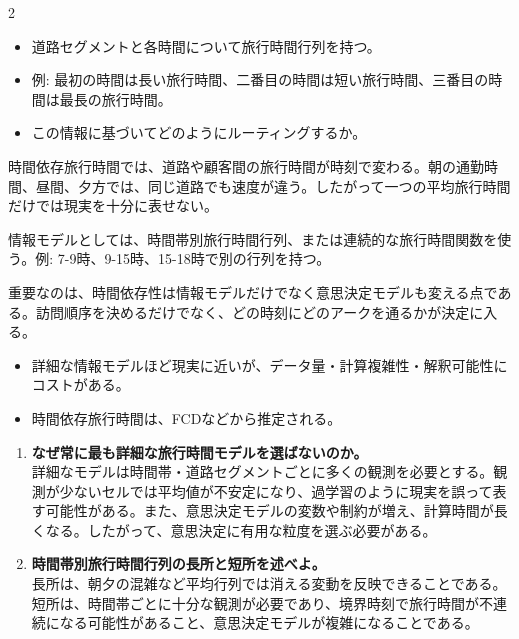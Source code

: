 \clearpage
{}
\begin{multicols}{2}\footnotesize\raggedcolumns
{}
\begin{itemize}
\item 道路セグメントと各時間について旅行時間行列を持つ。
\item 例: 最初の時間は長い旅行時間、二番目の時間は短い旅行時間、三番目の時間は最長の旅行時間。
\item この情報に基づいてどのようにルーティングするか。
\end{itemize}
時間依存旅行時間では、道路や顧客間の旅行時間が時刻で変わる。朝の通勤時間、昼間、夕方では、同じ道路でも速度が違う。したがって一つの平均旅行時間だけでは現実を十分に表せない。\par

情報モデルとしては、時間帯別旅行時間行列、または連続的な旅行時間関数を使う。例: 7-9時、9-15時、15-18時で別の行列を持つ。\par

重要なのは、時間依存性は情報モデルだけでなく意思決定モデルも変える点である。訪問順序を決めるだけでなく、どの時刻にどのアークを通るかが決定に入る。\par
{}
\begin{itemize}
\item 詳細な情報モデルほど現実に近いが、データ量・計算複雑性・解釈可能性にコストがある。
\item 時間依存旅行時間は、FCDなどから推定される。
\end{itemize}
\begin{enumerate}
\item \textbf{なぜ常に最も詳細な旅行時間モデルを選ばないのか。}\\詳細なモデルは時間帯・道路セグメントごとに多くの観測を必要とする。観測が少ないセルでは平均値が不安定になり、過学習のように現実を誤って表す可能性がある。また、意思決定モデルの変数や制約が増え、計算時間が長くなる。したがって、意思決定に有用な粒度を選ぶ必要がある。
\item \textbf{時間帯別旅行時間行列の長所と短所を述べよ。}\\長所は、朝夕の混雑など平均行列では消える変動を反映できることである。短所は、時間帯ごとに十分な観測が必要であり、境界時刻で旅行時間が不連続になる可能性があること、意思決定モデルが複雑になることである。
\end{enumerate}
\end{multicols}

